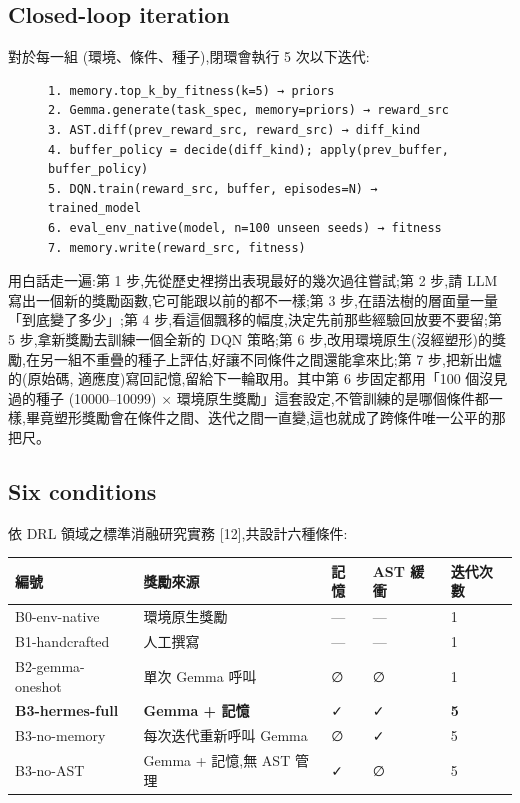 \documentclass[conference,onecolumn,letterpaper,10pt]{IEEEtran}
\begin{document}
\subsection{Closed-loop iteration}

對於每一組 (環境、條件、種子),閉環會執行 5 次以下迭代:

\begin{figure}[t]
\centering
\small
\begin{verbatim}
1. memory.top_k_by_fitness(k=5) → priors
2. Gemma.generate(task_spec, memory=priors) → reward_src
3. AST.diff(prev_reward_src, reward_src) → diff_kind
4. buffer_policy = decide(diff_kind); apply(prev_buffer, buffer_policy)
5. DQN.train(reward_src, buffer, episodes=N) → trained_model
6. eval_env_native(model, n=100 unseen seeds) → fitness
7. memory.write(reward_src, fitness)
\end{verbatim}
\end{figure}

用白話走一遍:第 1 步,先從歷史裡撈出表現最好的幾次過往嘗試;第 2 步,請 LLM 寫出一個新的獎勵函數,它可能跟以前的都不一樣;第 3 步,在語法樹的層面量一量「到底變了多少」;第 4 步,看這個飄移的幅度,決定先前那些經驗回放要不要留;第 5 步,拿新獎勵去訓練一個全新的 DQN 策略;第 6 步,改用環境原生(沒經塑形)的獎勵,在另一組不重疊的種子上評估,好讓不同條件之間還能拿來比;第 7 步,把新出爐的(原始碼, 適應度)寫回記憶,留給下一輪取用。其中第 6 步固定都用「100 個沒見過的種子 (10000--10099) × 環境原生獎勵」這套設定,不管訓練的是哪個條件都一樣,畢竟塑形獎勵會在條件之間、迭代之間一直變,這也就成了跨條件唯一公平的那把尺。

\subsection{Six conditions}

依 DRL 領域之標準消融研究實務 {[}12{]},共設計六種條件:

\begin{table}[t]
\centering
\small
\begin{tabular}{@{}lllll@{}}
\toprule
編號 & 獎勵來源 & 記憶 & AST 緩衝 & 迭代次數 \\
\midrule
B0-env-native & 環境原生獎勵 & --- & --- & 1 \\
B1-handcrafted & 人工撰寫 & --- & --- & 1 \\
B2-gemma-oneshot & 單次 Gemma 呼叫 & ∅ & ∅ & 1 \\
\textbf{B3-hermes-full} & \textbf{Gemma + 記憶} & ✓ & ✓ & \textbf{5} \\
B3-no-memory & 每次迭代重新呼叫 Gemma & ∅ & ✓ & 5 \\
B3-no-AST & Gemma + 記憶,無 AST 管理 & ✓ & ∅ & 5 \\
\bottomrule
\end{tabular}
\end{table}
\end{document}
